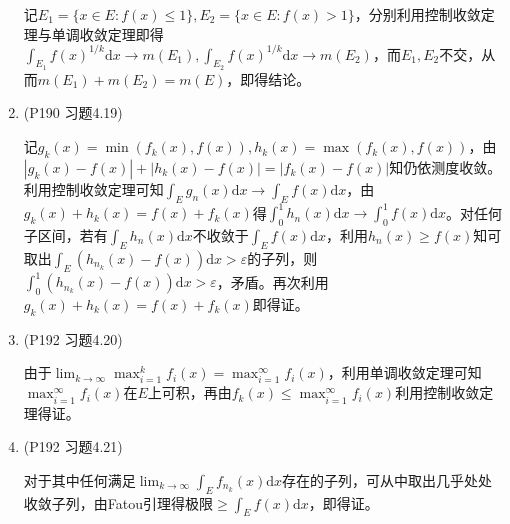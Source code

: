 \documentclass[a4paper,UTF8,fontset=windows]{ctexart}
\begin{document}
\begin{enumerate}
    记$E_1=\{x\in E:f(x)\le1\},E_2=\{x\in E:f(x)>1\}$，分别利用控制收敛定理与单调收敛定理即得$\int_{E_1}{f(x)}^{1/k}\mathrm{d}x\to m(E_1),\int_{E_2}{f(x)}^{1/k}\mathrm{d}x\to m(E_2)$，而$E_1,E_2$不交，从而$m(E_1)+m(E_2)=m(E)$，即得结论。
    
    \item (P190 习题4.19)
    
    记$g_k(x)=\min(f_k(x),f(x)),h_k(x)=\max(f_k(x),f(x))$，由$|g_k(x)-f(x)|+|h_k(x)-f(x)|=|f_k(x)-f(x)|$知仍依测度收敛。利用控制收敛定理可知$\int_Eg_n(x)\mathrm{d}x\to\int_Ef(x)\mathrm{d}x$，由$g_k(x)+h_k(x)=f(x)+f_k(x)$得$\int_0^1h_n(x)\mathrm{d}x\to\int_0^1f(x)\mathrm{d}x$。对任何子区间，若有$\int_Eh_n(x)\mathrm{d}x$不收敛于$\int_Ef(x)\mathrm{d}x$，利用$h_n(x)\ge f(x)$知可取出$\int_E(h_{n_k}(x)-f(x))\mathrm{d}x>\varepsilon$的子列，则$\int_0^1(h_{n_k}(x)-f(x))\mathrm{d}x>\varepsilon$，矛盾。再次利用$g_k(x)+h_k(x)=f(x)+f_k(x)$即得证。
    
    \item (P192 习题4.20)
    
    由于$\lim_{k\to\infty}\max_{i=1}^kf_i(x)=\max_{i=1}^\infty f_i(x)$，利用单调收敛定理可知$\max_{i=1}^\infty f_i(x)$在$E$上可积，再由$f_k(x)\le\max_{i=1}^\infty f_i(x)$利用控制收敛定理得证。
    
    \item (P192 习题4.21)
    
    对于其中任何满足$\lim_{k\to\infty}\int_Ef_{n_k}(x)\mathrm{d}x$存在的子列，可从中取出几乎处处收敛子列，由Fatou引理得极限$\ge\int_Ef(x)\mathrm{d}x$，即得证。
\end{enumerate}
\end{document}
